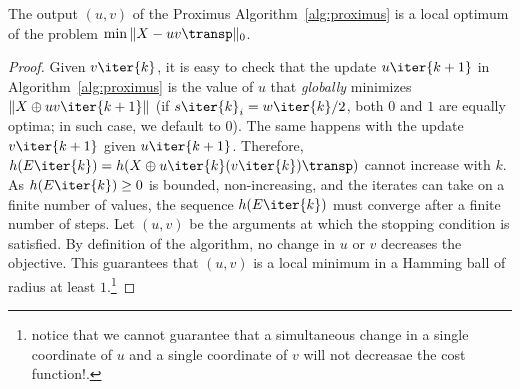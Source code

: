 \documentclass[twocolumn]{IEEEtran}
\begin{document}
\begin{proposition}
The output $(u,v)$ of the Proximus Algorithm~\ref{alg:proximus} is a local optimum of the problem $\min \|X - uv\transp\|_0$. 
\end{proposition}
\begin{proof}
 Given $v\iter{k}$, it is easy to check that the update $u\iter{k+1}$ in Algorithm~\ref{alg:proximus} is the value of $u$ that \emph{globally} minimizes $\|X \oplus uv\iter{k+1} \|$ (if $ s\iter{k}_i = w\iter{k}/2$, both $0$ and $1$ are equally optima; in such case, we default to $0$). The same happens with the update $v\iter{k+1}$ given $u\iter{k+1}$. Therefore, $h(E\iter{k})=h(X \oplus u\iter{k}(v\iter{k})\transp)$ cannot increase with $k$. As $h(E\iter{k}) \geq 0$ is bounded, non-increasing, and the iterates can take on a finite number of values, the sequence $h(E\iter{k})$ must converge  after a finite number of steps. Let $(u,v)$ be the arguments at which the stopping condition is satisfied. By definition of the algorithm, no change in $u$ or $v$ decreases the objective. This guarantees that $(u,v)$ is a local minimum in a Hamming ball of radius at least $1$.\footnote{notice that we cannot guarantee that a simultaneous change in a single coordinate of $u$ and a single coordinate of $v$ will not decreasae the cost function!.} 
\end{proof}

%
%
\end{document}
